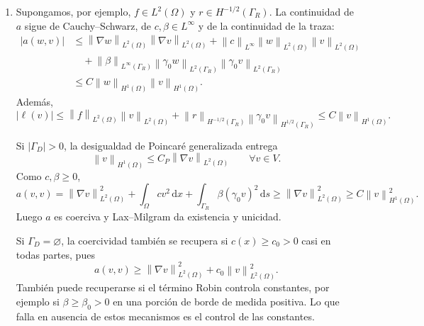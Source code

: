 \documentclass[11pt]{article}
\newcommand{\norm}[1]{\left\lVert #1\right\rVert}
\newcommand{\abs}[1]{\left|#1\right|}
\def\dx{\mbox{\(\,\mathrm{d}x\)}}
\def\ds{\mbox{\(\,\mathrm{d}s\)}}
\begin{document}
\begin{enumerate}[label=\textbf{\arabic*.}, leftmargin=*]
\begin{enumerate}[label=(\alph*)]
        \item Supongamos, por ejemplo, $f\in L^2(\Omega)$ y $r\in H^{-1/2}(\Gamma_R)$. La continuidad de $a$ sigue de Cauchy--Schwarz, de $c,\beta\in L^\infty$ y de la continuidad de la traza:
        \begin{align*}
            \abs{a(w,v)}
            &\le
            \norm{\nabla w}_{L^2(\Omega)}\norm{\nabla v}_{L^2(\Omega)}
            +\norm{c}_{L^\infty}\norm{w}_{L^2(\Omega)}\norm{v}_{L^2(\Omega)}\\
            &\quad
            +\norm{\beta}_{L^\infty(\Gamma_R)}
            \norm{\gamma_0w}_{L^2(\Gamma_R)}
            \norm{\gamma_0v}_{L^2(\Gamma_R)}\\
            &\le C\norm{w}_{H^1(\Omega)}\norm{v}_{H^1(\Omega)}.
        \end{align*}
        Además,
        \[
            \abs{\ell(v)}
            \le
            \norm{f}_{L^2(\Omega)}\norm{v}_{L^2(\Omega)}
            +\norm{r}_{H^{-1/2}(\Gamma_R)}
            \norm{\gamma_0v}_{H^{1/2}(\Gamma_R)}
            \le C\norm{v}_{H^1(\Omega)}.
        \]

        Si $|\Gamma_D|>0$, la desigualdad de Poincaré generalizada entrega
        \[
            \norm{v}_{H^1(\Omega)}\le C_P\norm{\nabla v}_{L^2(\Omega)}
            \qquad\forall v\in V.
        \]
        Como $c,\beta\ge0$,
        \[
            a(v,v)
            =
            \norm{\nabla v}_{L^2(\Omega)}^2
            +\int_\Omega cv^2\dx
            +\int_{\Gamma_R}\beta(\gamma_0v)^2\ds
            \ge
            \norm{\nabla v}_{L^2(\Omega)}^2
            \ge
            C\norm{v}_{H^1(\Omega)}^2.
        \]
        Luego $a$ es coerciva y Lax--Milgram da existencia y unicidad.

        Si $\Gamma_D=\varnothing$, la coercividad también se recupera si $c(x)\ge c_0>0$ casi en todas partes, pues
        \[
            a(v,v)\ge \norm{\nabla v}_{L^2(\Omega)}^2+c_0\norm{v}_{L^2(\Omega)}^2.
        \]
        También puede recuperarse si el término Robin controla constantes, por ejemplo si $\beta\ge\beta_0>0$ en una porción de borde de medida positiva. Lo que falla en ausencia de estos mecanismos es el control de las constantes.


\end{enumerate}
\end{enumerate}
\end{document}
